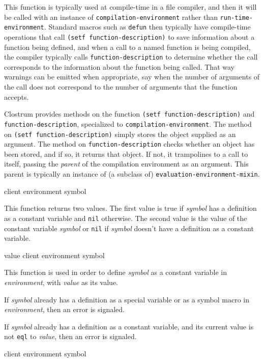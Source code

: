 This function is typically used at compile-time in a file compiler,
and then it will be called with an instance of
\texttt{compilation-environment} rather than
\texttt{run-time-environment}.  Standard macros such as \texttt{defun}
then typically have compile-time operations that call \texttt{(setf
  function-description)} to save information about a function being
defined, and when a call to a named function is being compiled, the
compiler typically calls \texttt{function-description} to determine
whether the call corresponds to the information about the function
being called.  That way warnings can be emitted when appropriate, say
when the number of arguments of the call does not correspond to the
number of arguments that the function accepts.

Clostrum provides methods on the function \texttt{(setf
  function-description)} and \texttt{function-description},
specialized to \texttt{compilation-environment}.  The method on
\texttt{(setf function-description)} simply stores the object supplied
as an argument.  The method on \texttt{function-description} checks
whether an object has been stored, and if so, it returns that object.
If not, it trampolines to a call to itself, passing the \emph{parent}
of the compilation environment as an argument.  This parent is
typically an instance of (a subclass of)
\texttt{evaluation-environment-mixin}.

 {client environment symbol}

This function returns two values. The first value is true if \textit{symbol}
has a definition as a constant variable and \texttt{nil} otherwise. The second
value is the value of the constant variable \textit{symbol} or \texttt{nil} if
\textit{symbol} doesn't have a definition as a constant variable.

 {value client environment symbol}

This function is used in order to define \textit{symbol} as a constant
variable in \textit{environment}, with \textit{value} as its value.

If \textit{symbol} already has a definition as a special variable or
as a symbol macro in \textit{environment}, then an error is signaled.

If \textit{symbol} already has a definition as a constant variable,
and its current value is not \texttt{eql} to \textit{value}, then an
error is signaled.

 {client environment symbol}

